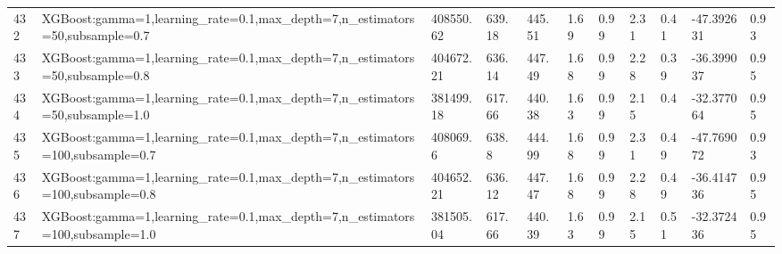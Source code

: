 \begin{longtable}{C{0.8cm} L{2cm} C{1.15cm} C{1.15cm} C{1.15cm} C{1.15cm} C{0.85cm} C{1.25cm} C{1.2cm} C{1.5cm} C{1.0cm}}
432 & XGBoost:\newline gamma=1,\newline learning\_rate=0.1,\newline max\_depth=7,\newline n\_estimators=50,\newline subsample=0.7 & 408550.62 & 639.18 & 445.51 & 1.69 & 0.99 & 2.31 & 0.41 & -47.392631 & 0.93 \\
433 & XGBoost:\newline gamma=1,\newline learning\_rate=0.1,\newline max\_depth=7,\newline n\_estimators=50,\newline subsample=0.8 & 404672.21 & 636.14 & 447.49 & 1.68 & 0.99 & 2.28 & 0.39 & -36.399037 & 0.95 \\
434 & XGBoost:\newline gamma=1,\newline learning\_rate=0.1,\newline max\_depth=7,\newline n\_estimators=50,\newline subsample=1.0 & 381499.18 & 617.66 & 440.38 & 1.63 & 0.99 & 2.15 & 0.4 & -32.377064 & 0.95 \\
435 & XGBoost:\newline gamma=1,\newline learning\_rate=0.1,\newline max\_depth=7,\newline n\_estimators=100,\newline subsample=0.7 & 408069.6 & 638.8 & 444.99 & 1.68 & 0.99 & 2.31 & 0.49 & -47.769072 & 0.93 \\
436 & XGBoost:\newline gamma=1,\newline learning\_rate=0.1,\newline max\_depth=7,\newline n\_estimators=100,\newline subsample=0.8 & 404652.21 & 636.12 & 447.47 & 1.68 & 0.99 & 2.28 & 0.49 & -36.414736 & 0.95 \\
437 & XGBoost:\newline gamma=1,\newline learning\_rate=0.1,\newline max\_depth=7,\newline n\_estimators=100,\newline subsample=1.0 & 381505.04 & 617.66 & 440.39 & 1.63 & 0.99 & 2.15 & 0.51 & -32.372436 & 0.95 \\

\end{longtable}
